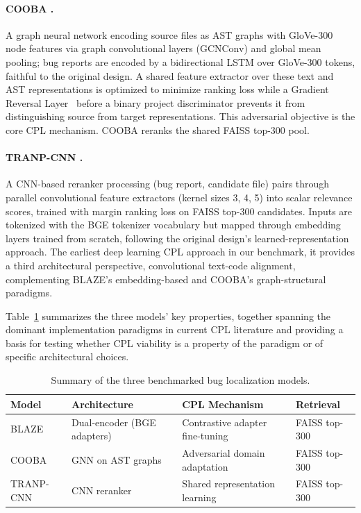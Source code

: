 \documentclass[a4paper,fleqn]{cas-dc}
\begin{document}
\paragraph{COOBA \citep{zhu2020cooba}.}
A graph neural network encoding source files as AST graphs with GloVe-300
node features via graph convolutional layers (GCNConv) and global mean
pooling; bug reports are encoded by a bidirectional LSTM over GloVe-300
tokens, faithful to the original design. A shared feature extractor over
these text and AST representations is optimized to minimize ranking loss
while a Gradient Reversal Layer~\citep{ganin2016domain} before a binary
project discriminator prevents it from distinguishing source from target
representations. This adversarial objective is the core CPL mechanism.
COOBA reranks the shared FAISS top-300 pool.

\paragraph{TRANP-CNN \citep{huo2019deep}.}
A CNN-based reranker processing (bug report, candidate file) pairs through
parallel convolutional feature extractors (kernel sizes 3, 4, 5) into
scalar relevance scores, trained with margin ranking loss on FAISS top-300
candidates. Inputs are tokenized with the BGE tokenizer vocabulary but
mapped through embedding layers trained from scratch, following the
original design's learned-representation approach. The earliest deep
learning CPL approach in our benchmark, it provides a third architectural
perspective, convolutional text-code alignment, complementing BLAZE's
embedding-based and COOBA's graph-structural paradigms.

Table~\ref{tab:models} summarizes the three models' key properties,
together spanning the dominant implementation paradigms in current CPL
literature and providing a basis for testing whether CPL viability is a
property of the paradigm or of specific architectural choices.

\begin{table}[t]
\centering
\caption{Summary of the three benchmarked bug localization models.}
\label{tab:models}
\begin{tabular}{@{}llll@{}}
\toprule
\textbf{Model} & \textbf{Architecture} & \textbf{CPL Mechanism} & \textbf{Retrieval} \\
\midrule
BLAZE \citep{chakraborty2025blaze} & Dual-encoder (BGE adapters) & Contrastive adapter fine-tuning & FAISS top-300 \\
COOBA \citep{zhu2020cooba}          & GNN on AST graphs          & Adversarial domain adaptation   & FAISS top-300 \\
TRANP-CNN \citep{huo2019deep}       & CNN reranker               & Shared representation learning  & FAISS top-300 \\
\bottomrule
\end{tabular}
\end{table}
\end{document}

